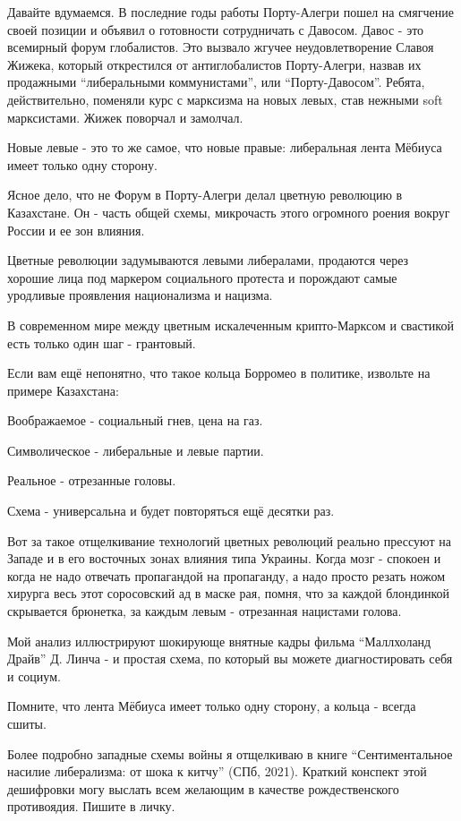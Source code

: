 Давайте вдумаемся. В последние годы работы Порту-Алегри пошел на смягчение
своей позиции и объявил о готовности сотрудничать с Давосом. Давос - это
всемирный форум глобалистов. Это вызвало жгучее неудовлетворение Славоя Жижека,
который открестился от антиглобалистов Порту-Алегри, назвав их продажными
\enquote{либеральными коммунистами}, или \enquote{Порту-Давосом}. Ребята, действительно,
поменяли курс с марксизма на новых левых, став нежными  soft марксистами. Жижек
поворчал и замолчал.

Новые левые - это то же самое, что новые правые: либеральная лента Мёбиуса
имеет только одну сторону.

Ясное дело, что не Форум в Порту-Алегри делал цветную революцию в Казахстане.
Он - часть общей схемы, микрочасть этого огромного роения вокруг России и ее
зон влияния.

Цветные революции задумываются левыми либералами, продаются через хорошие лица
под маркером социального протеста и порождают самые уродливые проявления
национализма и нацизма. 

В современном мире между цветным искалеченным крипто-Марксом и свастикой есть
только один шаг - грантовый.

Если вам ещё непонятно, что такое кольца Борромео в политике, извольте на
примере Казахстана:

Воображаемое - социальный гнев, цена на газ.  

Символическое - либеральные и левые партии.  

Реальное - отрезанные головы.

Схема - универсальна и будет повторяться ещё десятки раз.

Вот за такое отщелкивание технологий цветных революций реально прессуют на
Западе и в его восточных зонах влияния типа Украины. Когда мозг - спокоен и
когда не надо отвечать пропагандой на пропаганду, а надо просто резать ножом
хирурга весь этот соросовский ад в маске рая, помня, что за каждой блондинкой
скрывается брюнетка, за каждым левым - отрезанная нацистами голова.

Мой анализ иллюстрируют шокирующе внятные кадры фильма \enquote{Маллхоланд Драйв} Д.
Линча - и простая схема, по который вы можете диагностировать себя и социум.

Помните, что лента Мёбиуса имеет только одну сторону, а кольца - всегда сшиты.

Более подробно западные схемы войны я отщелкиваю в книге \enquote{Сентиментальное
насилие либерализма: от шока к китчу} (СПб, 2021). Краткий конспект этой
дешифровки могу выслать всем желающим в качестве рождественского противоядия.
Пишите в личку.
